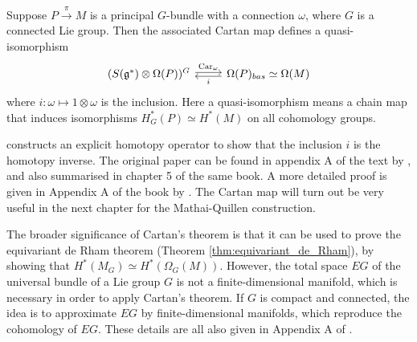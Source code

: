 \begin{thm} %
	Suppose $P\xrightarrow{\pi}M$ is a principal $G$-bundle with a connection
	$\omega$, where $G$ is a connected Lie group.
	Then the associated Cartan map defines a quasi-isomorphism
	\[
	\begin{tikzcd}
		(S(\mathfrak{g}^*) \otimes \Omega(P))^G
		\arrow[shift left=0.4ex]{r}{\operatorname{Car}_{\omega}}
		& \Omega(P)_{bas} \simeq \Omega(M) \arrow[shift left=0.4ex]{l}{i}	
	\end{tikzcd}
	\] 
	where $i : \omega \mapsto 1\otimes \omega$ is the inclusion.
	Here a quasi-isomorphism means a chain map that
	induces isomorphisms 
	$H_G^*(P)\simeq H^*(M)$ on all cohomology
	groups. 
	\begin{comment}
	\[\begin{tikzcd}[column sep = 3.5em]
			{W(\mathfrak{g})\otimes\Omega(P)} & {\Omega(P)} \\
				{(S(\mathfrak{g}^*)\otimes\Omega(P))^G} &
				{\Omega(P)_{\text{bas}}} &[-4.1em] {\simeq\Omega(M)}
					\arrow[from=1-1, to=2-1]
						\arrow[from=1-2, to=2-2]
							\arrow["w", from=1-1, to=1-2]
							\arrow["\operatorname{Hor}\circ w", from=2-1, to=2-2]
			\end{tikzcd}\]
	\end{comment}
\end{thm}
\citet{cartan} constructs an explicit homotopy operator to show that the 
inclusion $i$ is the homotopy inverse. The original paper can be found in
appendix A of the text by \citet{guillemin}, and also summarised in chapter 5 of
the same book. A more detailed proof is given in Appendix A of the book by
\citet{equivariant_tu}. 
The Cartan map will turn out be very useful in the next chapter for the
Mathai-Quillen construction.


The broader significance of Cartan's theorem is that it can be used to prove the 
equivariant de Rham theorem (Theorem \ref{thm:equivariant_de_Rham}), by showing
that $H^*(M_G) \simeq H^*(\Omega_G(M))$.
However, the total space $EG$ of the universal bundle 
 of a Lie group $G$ is not a finite-dimensional manifold, which is necessary
in order to apply Cartan's theorem. If $G$ is compact and connected,
the idea is to approximate $EG$ by
finite-dimensional manifolds, which reproduce the cohomology of $EG$. 
These details are all also given in Appendix A of \cite{equivariant_tu}.

